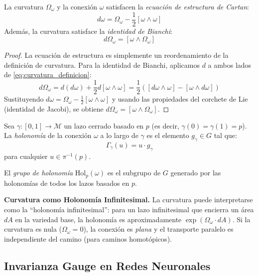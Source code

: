 \begin{theorem}\label{thm:cartan_estructura}
La curvatura $\Omega_\omega$ y la conexión $\omega$ satisfacen la \textit{ecuación de estructura de Cartan}:
\begin{equation}\label{eq:estructura_cartan}
d\omega = \Omega_\omega - \frac{1}{2}[\omega \wedge \omega]
\end{equation}
Además, la curvatura satisface la \textit{identidad de Bianchi}:
\begin{equation}\label{eq:bianchi}
d\Omega_\omega = [\omega \wedge \Omega_\omega]
\end{equation}
\end{theorem}

\begin{proof}
La ecuación de estructura es simplemente un reordenamiento de la definición de curvatura. Para la identidad de Bianchi, aplicamos $d$ a ambos lados de \eqref{eq:curvatura_definicion}:
\[
d\Omega_\omega = d(d\omega) + \frac{1}{2}d[\omega \wedge \omega] = \frac{1}{2}([d\omega \wedge \omega] - [\omega \wedge d\omega])
\]
Sustituyendo $d\omega = \Omega_\omega - \frac{1}{2}[\omega \wedge \omega]$ y usando las propiedades del corchete de Lie (identidad de Jacobi), se obtiene $d\Omega_\omega = [\omega \wedge \Omega_\omega]$.
\end{proof}

\begin{definition}[Holonomía]\label{def:holonomia}
Sea $\gamma: [0,1] \to \mathcal{M}$ un lazo cerrado basado en $p$ (es decir, $\gamma(0) = \gamma(1) = p$). La \textit{holonomía} de la conexión $\omega$ a lo largo de $\gamma$ es el elemento $g_\gamma \in G$ tal que:
\[
\Gamma_\gamma(u) = u \cdot g_\gamma
\]
para cualquier $u \in \pi^{-1}(p)$.

El \textit{grupo de holonomía} $\mathrm{Hol}_p(\omega)$ es el subgrupo de $G$ generado por las holonomías de todos los lazos basados en $p$.
\end{definition}

\textbf{Curvatura como Holonomía Infinitesimal.} La curvatura puede interpretarse como la ``holonomía infinitesimal'': para un lazo infinitesimal que encierra un área $dA$ en la variedad base, la holonomía es aproximadamente $\exp(\Omega_\omega \cdot dA)$. Si la curvatura es nula ($\Omega_\omega = 0$), la conexión es \textit{plana} y el transporte paralelo es independiente del camino (para caminos homotópicos).

\subsection{Invarianza Gauge en Redes Neuronales}\label{subsec:invarianza_gauge_redes}

